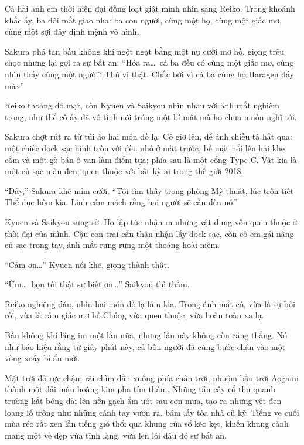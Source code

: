 \documentclass[../main.tex]{subfiles}
\begin{document}
Cả hai anh em thời hiện đại đồng loạt giật mình nhìn sang Reiko. Trong khoảnh khắc ấy, ba đôi mắt giao nha: ba con người, cùng một họ, cùng một giấc mơ, cùng một sợi dây định mệnh vô hình.

Sakura phá tan bầu không khí ngột ngạt bằng một nụ cười mơ hồ, giọng trêu chọc nhưng lại gợi ra sự bất an: ``Hóa ra\dots\ cả ba đều có cùng một giấc mơ, cùng nhìn thấy cùng một người? Thú vị thật. Chắc bởi vì cả ba cùng họ Haragen đấy mà\~{}''

Reiko thoáng đỏ mặt, còn Kyuen và Saikyou nhìn nhau với ánh mắt nghiêm trọng, như thể cô ấy đã vô tình nói trúng một bí mật mà họ chưa muốn nghĩ tới.

Sakura chợt rút ra từ túi áo hai món đồ lạ. Cô giơ lên, để ánh chiều tà hắt qua: một chiếc dock sạc hình tròn với đèn nhỏ ở mặt trước, bề mặt nổi lên hai khe cắm và một gờ bán ô-van làm điểm tựa; phía sau là một cổng Type-C. Vật kia là một củ sạc màu đen, quen thuộc với bất kỳ ai trong thế giới 2018.

``Đây,'' Sakura khẽ mỉm cười. ``Tôi tìm thấy trong phòng Mỹ thuật, lúc trốn tiết Thể dục hôm kia. Linh cảm mách rằng hai người sẽ cần đến nó.''

Kyuen và Saikyou sững sờ. Họ lập tức nhận ra những vật dụng vốn quen thuộc ở thời đại của mình. Cậu con trai cẩn thận nhận lấy dock sạc, còn cô em gái nâng củ sạc trong tay, ánh mắt rưng rưng một thoáng hoài niệm.

``Cảm ơn\dots'' Kyuen nói khẽ, giọng thành thật.

``Ừm\dots\ bọn tôi thật sự biết ơn\dots'' Saikyou thì thầm.

Reiko nghiêng đầu, nhìn hai món đồ lạ lẫm kia. Trong ánh mắt cô, vừa là sự bối rối, vừa là cảm giác mơ hồ.Chúng vừa quen thuộc, vừa hoàn toàn xa lạ.

Bầu không khí lặng im một lần nữa, nhưng lần này không còn căng thẳng. Nó như báo hiệu rằng từ giây phút này, cả bốn người đã cùng bước chân vào một vòng xoáy bí ẩn mới.

\ct

Mặt trời đỏ rực chậm rãi chìm dần xuống phía chân trời, nhuộm bầu trời Aogami thành một dải màu hoàng kim pha tím thẫm. Những tán cây cổ thụ quanh trường hắt bóng dài lên nền gạch ẩm ướt sau cơn mưa, tạo ra những vệt đen loang lổ trông như những cánh tay vươn ra, bám lấy tòa nhà cũ kỹ. Tiếng ve cuối mùa réo rắt xen lẫn tiếng gió thổi qua khung cửa sổ kẽo kẹt, khiến khung cảnh mang một vẻ đẹp vừa tĩnh lặng, vừa len lỏi đâu đó sự bất an.
\end{document}
